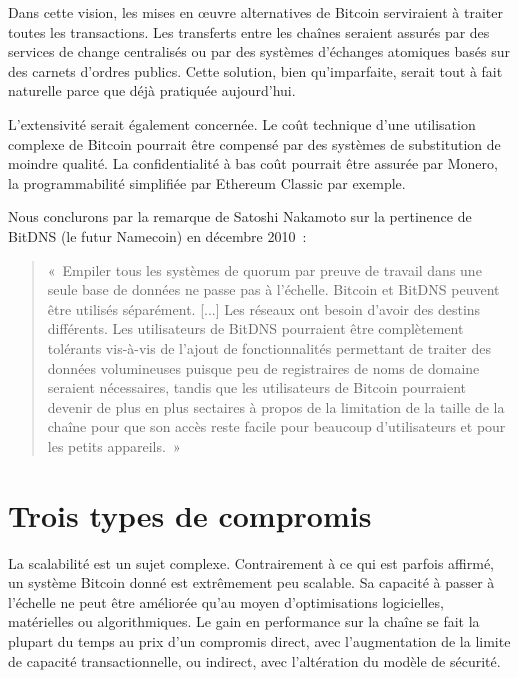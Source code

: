 Dans cette vision, les mises en œuvre alternatives de Bitcoin serviraient à traiter toutes les transactions. Les transferts entre les chaînes seraient assurés par des services de change centralisés ou par des systèmes d'échanges atomiques basés sur des carnets d'ordres publics. Cette solution, bien qu'imparfaite, serait tout à fait naturelle parce que déjà pratiquée aujourd'hui.

L'extensivité serait également concernée. Le coût technique d'une utilisation complexe de Bitcoin pourrait être compensé par des systèmes de substitution de moindre qualité. La confidentialité à bas coût pourrait être assurée par Monero, la programmabilité simplifiée par Ethereum Classic par exemple.

Nous conclurons par la remarque de Satoshi Nakamoto sur la pertinence de BitDNS (le futur Namecoin) en décembre 2010~:

\begin{quote}
«~Empiler tous les systèmes de quorum par preuve de travail dans une seule base de données ne passe pas à l'échelle. Bitcoin et BitDNS peuvent être utilisés séparément. [...] Les réseaux ont besoin d'avoir des destins différents. Les utilisateurs de BitDNS pourraient être complètement tolérants vis-à-vis de l'ajout de fonctionnalités permettant de traiter des données volumineuses puisque peu de registraires de noms de domaine seraient nécessaires, tandis que les utilisateurs de Bitcoin pourraient devenir de plus en plus sectaires à propos de la limitation de la taille de la chaîne pour que son accès reste facile pour beaucoup d'utilisateurs et pour les petits appareils.~»
\end{quote}

\section*{Trois types de compromis}

La scalabilité est un sujet complexe. Contrairement à ce qui est parfois affirmé, un système Bitcoin donné est extrêmement peu scalable. Sa capacité à passer à l'échelle ne peut être améliorée qu'au moyen d'optimisations logicielles, matérielles ou algorithmiques. Le gain en performance sur la chaîne se fait la plupart du temps au prix d'un compromis direct, avec l'augmentation de la limite de capacité transactionnelle, ou indirect, avec l'altération du modèle de sécurité.

